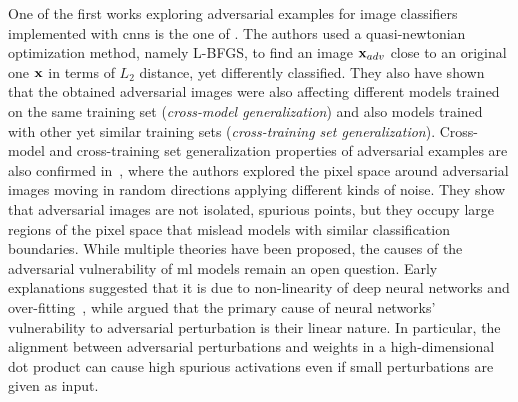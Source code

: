 One of the first works exploring adversarial examples for image classifiers implemented with \glspl{cnn} is the one of \citet{szegedy2013intriguing}.
The authors used a quasi-newtonian optimization method, namely L-BFGS, to find an image $\mathbf{x}_{adv}$ close to an original one $\mathbf{x}$ in terms of $L_2$ distance, yet differently classified.
They also have shown that the obtained adversarial images were also affecting different models trained on the same training set (\emph{cross-model generalization}) and also models trained with other yet similar training sets (\emph{cross-training set generalization}).
Cross-model and cross-training set generalization properties of adversarial examples are also confirmed in~\cite{tabacof2016exploring}, where the authors explored the pixel space around adversarial images moving in random directions applying different kinds of noise.
They show that adversarial images are not isolated, spurious points, but they occupy large regions of the pixel space that mislead models with similar classification boundaries.
While multiple theories have been proposed, the causes of the adversarial vulnerability of \gls{ml} models remain an open question.
Early explanations suggested that it is due to non-linearity of deep neural networks and over-fitting~\cite{tabacof2016exploring}, while \citet{goodfellow2014explaining} argued that the primary cause of neural networks' vulnerability to adversarial perturbation is their linear nature.
In particular, the alignment between adversarial perturbations and weights in a high-dimensional dot product can cause high spurious activations even if small perturbations are given as input.

